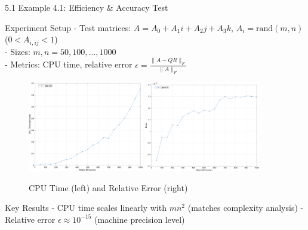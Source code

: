 \documentclass{beamer}
\begin{document}
\begin{frame}{5.1 Example 4.1: Efficiency \& Accuracy Test}
  \begin{block}{Experiment Setup}
    - Test matrices: $A = A_0 + A_1i + A_2j + A_3k$, $A_i = \text{rand}(m,n)$ ($0 < A_{i,ij} < 1$)\\
    - Sizes: $m,n = 50,100,\dots,1000$\\
    - Metrics: CPU time, relative error $\epsilon = \frac{\|A - QR\|_F}{\|A\|_F}$
  \end{block}
  
  \begin{figure}[h]
    \centering
    \includegraphics[width=0.45\textwidth]{images/Figure_2.png} %
    \includegraphics[width=0.45\textwidth]{images/Figure_3.png} %
    \caption{CPU Time (left) and Relative Error (right)}
  \end{figure}
  
  \begin{block}{Key Results}
    - CPU time scales linearly with $mn^2$ (matches complexity analysis)
    - Relative error $\epsilon \approx 10^{-15}$ (machine precision level)
  \end{block}
\end{frame}
\end{document}
